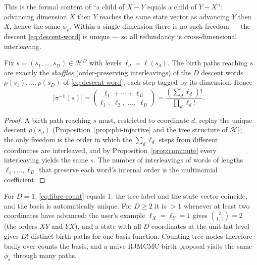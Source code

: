 \documentclass[11pt]{article}
\begin{document}
This is the formal content of ``a child of $X\!-\!Y$ equals a child of
$Y\!-\!X$'': advancing dimension $X$ then $Y$ reaches the same state vector as
advancing $Y$ then $X$, hence the same $\phi_s$.  Within a single dimension
there is no such freedom --- the descent \eqref{eq:descent-word} is unique --- so
all redundancy is cross-dimensional interleaving.

\begin{proposition}
\label{prop:fibre}
Fix $s=(s_1,\dots,s_D)\in\mathcal{H}^D$ with levels $\ell_d=\ell(s_d)$.  The
birth paths reaching $s$ are exactly the \emph{shuffles} (order-preserving
interleavings) of the $D$ descent words $\rho(s_1),\dots,\rho(s_D)$ of
\eqref{eq:descent-word}, each step tagged by its dimension.  Hence
\begin{equation}
  \bigl|\pi^{-1}(s)\bigr|
  = \binom{\ell_1+\cdots+\ell_D}{\ell_1,\;\ell_2,\;\dots,\;\ell_D}
  = \frac{(\sum_d \ell_d)!}{\prod_d \ell_d!}.
  \label{eq:fibre-count}
\end{equation}
\end{proposition}
\begin{proof}
A birth path reaching $s$ must, restricted to coordinate $d$, replay the unique
descent $\rho(s_d)$ (Proposition~\ref{prop:phi-injective} and the tree structure
of $\mathcal{H}$); the only freedom is the order in which the $\sum_d\ell_d$
steps from different coordinates are interleaved, and by
Proposition~\ref{prop:commute} every interleaving yields the same $s$.  The
number of interleavings of words of lengths $\ell_1,\dots,\ell_D$ that preserve
each word's internal order is the multinomial coefficient.
\end{proof}

\begin{remark}
For $D=1$, \eqref{eq:fibre-count} equals $1$: the tree label and the state
vector coincide, and the basis is automatically unique.  For $D\ge2$ it is
$>1$ whenever at least two coordinates have advanced: the user's example
$\ell_X=\ell_Y=1$ gives $\binom{2}{1,1}=2$ (the orders $XY$ and $YX$), and a
state with all $D$ coordinates at the unit-hat level gives $D!$ distinct birth
paths for one basis function.  Counting tree nodes therefore badly
over-counts the basis, and a naive RJMCMC birth proposal visits the same
$\phi_s$ through many paths.
\end{remark}
\end{document}
